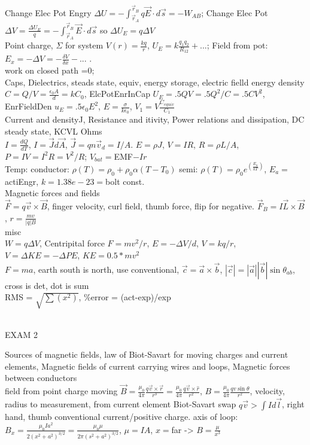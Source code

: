 \documentclass{article}
\begin{document}
\\Change Elec Pot Engry $\Delta U=-\int_{\vec{r}_A}^{\vec{r}_B} q\vec{E}\cdot d\vec{s}=-W_{AB}$; Change Elec Pot $\Delta V =\frac{\Delta U_E}{q}= -\int_{\vec{r}_A}^{\vec{r}_B} \vec{E}\cdot d\vec{s}$ so $\Delta U_E = q\Delta V$
\\Point charge, $\Sigma$ for system $V(r)=\frac{kq}{r}$, $U_E=k\frac{q_1q_2}{R_{12}}+$...; Field from pot: $E_x=-\Delta V=-\frac{\delta V}{\delta x}-$... .
\\work on closed path =0; 
\\\indent Caps, Dielectrics, steads state, equiv, energy storage, electric fielld energy density
\\$C=Q/V=\frac{\epsilon_0 A}{d}=kC_0$, ElcPotEnrInCap $U_E=.5 Q V =.5 Q^2/C = .5 C V^2$, EnrFieldDen $u_E=.5 \epsilon_0 E^2$, $E=\frac{\sigma}{k\epsilon_0}$, $V_1=V\frac{C_{equiv}}{C_1}$
\\\indent Current and densityJ, Resistance and itivity, Power relations and dissipation, DC steady state, KCVL Ohms
\\$I=\frac{dQ}{dT}$, $I=\vec J d\vec A$, $\vec J=q n \vec v_d=I/A$. $E=\rho J$, $V=IR$, $R=\rho L/A$, $P=IV=I^2R=V^2/R$; $V_{bat}=$EMF$-Ir$
\\Temp: conductor: $\rho(T)=\rho_0+\rho_0\alpha(T-T_0)$ semi: $\rho(T)=\rho_0e^{(\frac {E_a}{kT})}$, $E_a=$ actiEngr, $k=1.38e-23=$bolt const.
\\\indent Magnetic forces and fields
\\$\vec{F}=q \vec v \times \vec B$, finger velocity, curl field, thumb force, flip for negative. $\vec F_B=I \vec L \times \vec B$, $r=\frac{mv}{|q|B}$
\\\indent misc
\\$W=q\Delta V$, Centripital force $F=mv^2/r$, $E=-\Delta V/d$, $V=kq/r$, $V=\Delta KE=-\Delta PE$, $KE=0.5*mv^2$
\\$F=ma$, earth south is north, use conventional, $\vec c=\vec a \times\vec b$, $|\vec c|=|\vec a| |\vec b|\sin\theta_{ab}$, cross is det, dot is sum
\\RMS = $\sqrt{\sum(x^2)}$, \%error = (act-exp)/exp
\begin{Large}\\EXAM 2\end{Large}
\indent Sources of magnetic fields, law of Biot-Savart for moving charges and current elements, Magnetic fields of current carrying wires and loops, Magnetic forces between conductors
\\field from point charge moving $\vec B=\frac{\mu_0}{4\pi} \frac{q\vec v\times\vec r}{r^3}=\frac{\mu_0}{4\pi} \frac{q\vec v\times\hat r}{r^2}$, $B=\frac{\mu_0}{4\pi}\frac{qv\sin\theta}{r^2}$, velocity, radius to measurement, from current element Biot-Savart swap $q\vec v>\int Id\vec l$, right hand, thumb conventional current/positive charge. axis of loop: $B_x=\frac{\mu_0Ia^2}{2(x^2+a^2)^{3/2}}=\frac{\mu_0\mu}{2\pi(s^2+a^2)^{3/2}}$, $\mu=IA$, $x=$far -> $B=\frac{\mu}{x^3}$
\end{document}
